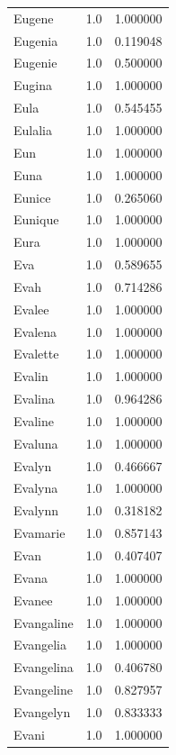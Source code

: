 \documentclass[
  letterpaper,
  DIV=11,
  numbers=noendperiod]{scrreprt}
\begin{document}
\begin{tabular}{lrr}
Eugene          &   1.0 &   1.000000 \\
Eugenia         &   1.0 &   0.119048 \\
Eugenie         &   1.0 &   0.500000 \\
Eugina          &   1.0 &   1.000000 \\
Eula            &   1.0 &   0.545455 \\
Eulalia         &   1.0 &   1.000000 \\
Eun             &   1.0 &   1.000000 \\
Euna            &   1.0 &   1.000000 \\
Eunice          &   1.0 &   0.265060 \\
Eunique         &   1.0 &   1.000000 \\
Eura            &   1.0 &   1.000000 \\
Eva             &   1.0 &   0.589655 \\
Evah            &   1.0 &   0.714286 \\
Evalee          &   1.0 &   1.000000 \\
Evalena         &   1.0 &   1.000000 \\
Evalette        &   1.0 &   1.000000 \\
Evalin          &   1.0 &   1.000000 \\
Evalina         &   1.0 &   0.964286 \\
Evaline         &   1.0 &   1.000000 \\
Evaluna         &   1.0 &   1.000000 \\
Evalyn          &   1.0 &   0.466667 \\
Evalyna         &   1.0 &   1.000000 \\
Evalynn         &   1.0 &   0.318182 \\
Evamarie        &   1.0 &   0.857143 \\
Evan            &   1.0 &   0.407407 \\
Evana           &   1.0 &   1.000000 \\
Evanee          &   1.0 &   1.000000 \\
Evangaline      &   1.0 &   1.000000 \\
Evangelia       &   1.0 &   1.000000 \\
Evangelina      &   1.0 &   0.406780 \\
Evangeline      &   1.0 &   0.827957 \\
Evangelyn       &   1.0 &   0.833333 \\
Evani           &   1.0 &   1.000000 \\

\end{tabular}
\end{document}
